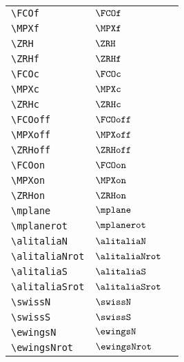 \begin{longtable}{lll}
 {\color[rgb]{0.5,0.5,0.5}\texttt{\textbackslash FCOf}} & $\FCOf$ & \\ 
 {\color[rgb]{0.5,0.5,0.5}\texttt{\textbackslash MPXf}} & $\MPXf$ & \\ 
 {\color[rgb]{0.5,0.5,0.5}\texttt{\textbackslash ZRH}} & $\ZRH$ & \\ 
 {\color[rgb]{0.5,0.5,0.5}\texttt{\textbackslash ZRHf}} & $\ZRHf$ & \\ 
 {\color[rgb]{0.5,0.5,0.5}\texttt{\textbackslash FCOc}} & $\FCOc$ & \\ 
 {\color[rgb]{0.5,0.5,0.5}\texttt{\textbackslash MPXc}} & $\MPXc$ & \\ 
 {\color[rgb]{0.5,0.5,0.5}\texttt{\textbackslash ZRHc}} & $\ZRHc$ & \\ 
 {\color[rgb]{0.5,0.5,0.5}\texttt{\textbackslash FCOoff}} & $\FCOoff$ & \\ 
 {\color[rgb]{0.5,0.5,0.5}\texttt{\textbackslash MPXoff}} & $\MPXoff$ & \\ 
 {\color[rgb]{0.5,0.5,0.5}\texttt{\textbackslash ZRHoff}} & $\ZRHoff$ & \\ 
 {\color[rgb]{0.5,0.5,0.5}\texttt{\textbackslash FCOon}} & $\FCOon$ & \\ 
 {\color[rgb]{0.5,0.5,0.5}\texttt{\textbackslash MPXon}} & $\MPXon$ & \\ 
 {\color[rgb]{0.5,0.5,0.5}\texttt{\textbackslash ZRHon}} & $\ZRHon$ & \\ 
 {\color[rgb]{0.5,0.5,0.5}\texttt{\textbackslash mplane}} & $\mplane$ & \\ 
 {\color[rgb]{0.5,0.5,0.5}\texttt{\textbackslash mplanerot}} & $\mplanerot$ & \\ 
 {\color[rgb]{0.5,0.5,0.5}\texttt{\textbackslash alitaliaN}} & $\alitaliaN$ & \\ 
 {\color[rgb]{0.5,0.5,0.5}\texttt{\textbackslash alitaliaNrot}} & $\alitaliaNrot$ & \\ 
 {\color[rgb]{0.5,0.5,0.5}\texttt{\textbackslash alitaliaS}} & $\alitaliaS$ & \\ 
 {\color[rgb]{0.5,0.5,0.5}\texttt{\textbackslash alitaliaSrot}} & $\alitaliaSrot$ & \\ 
 {\color[rgb]{0.5,0.5,0.5}\texttt{\textbackslash swissN}} & $\swissN$ & \\ 
 {\color[rgb]{0.5,0.5,0.5}\texttt{\textbackslash swissS}} & $\swissS$ & \\ 
 {\color[rgb]{0.5,0.5,0.5}\texttt{\textbackslash ewingsN}} & $\ewingsN$ & \\ 
 {\color[rgb]{0.5,0.5,0.5}\texttt{\textbackslash ewingsNrot}} & $\ewingsNrot$ & \\ 

\end{longtable}
